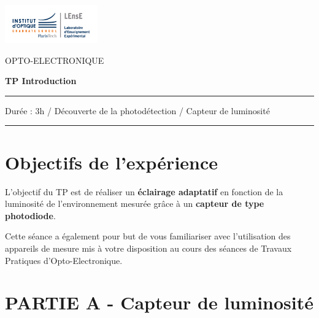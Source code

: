 \documentclass[a4paper,11pt]{article} %
\begin{document}
\newpage
\pagestyle{empty}

\begin{minipage}[c]{.25\linewidth}
	\includegraphics[width=4cm]{images/Logo-LEnsE.png}
\end{minipage} \hfill
\begin{minipage}[c]{.4\linewidth}

\begin{center}
\vspace{0.3cm}
{\Large OPTO-ELECTRONIQUE}

\medskip

\textbf{\Large TP Introduction}

\end{center}
\end{minipage}\hfill

\begin{center}
\vspace{0.3cm}

\noindent \rule{\linewidth}{1pt}

Durée : 3h / Découverte de la photodétection / Capteur de luminosité

\vspace{-0.2cm}
\noindent \rule{\linewidth}{1pt}
\end{center}

\section*{Objectifs de l'expérience}

L'objectif du TP est de réaliser un \textbf{éclairage adaptatif} en fonction de la luminosité de l'environnement mesurée grâce à un \textbf{capteur de type photodiode}.

Cette séance a également pour but de vous familiariser avec l'utilisation des appareils de mesure mis à votre disposition au cours des séances de Travaux Pratiques d'Opto-Electronique.


\section{PARTIE A - Capteur de luminosité}
\end{document}

